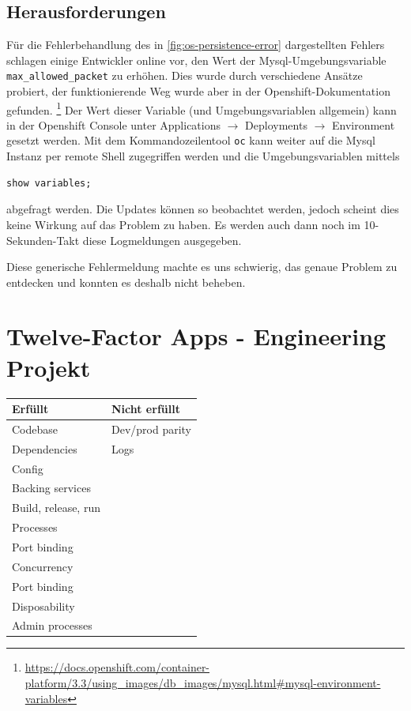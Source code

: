 \documentclass[12pt,a4paper]{article}
\begin{document}
\subsection{Herausforderungen}
Für die Fehlerbehandlung des in \ref{fig:os-persistence-error} dargestellten Fehlers schlagen einige Entwickler online vor, den Wert der Mysql-Umgebungsvariable \texttt{max\_allowed\_packet} zu erhöhen. Dies wurde durch verschiedene Ansätze probiert, der funktionierende Weg wurde aber in der Openshift-Dokumentation gefunden.  \footnote{\url{https://docs.openshift.com/container-platform/3.3/using\_images/db\_images/mysql.html\#mysql-environment-variables}}
Der Wert dieser Variable (und Umgebungsvariablen allgemein) kann in der Openshift Console unter Applications $\rightarrow$ Deployments $\rightarrow$ Environment gesetzt werden. Mit dem Kommandozeilentool \texttt{oc} kann weiter auf die Mysql Instanz per remote Shell zugegriffen werden und die Umgebungsvariablen mittels 
\begin{lstlisting}
show variables;
\end{lstlisting}
abgefragt werden. Die Updates können so beobachtet werden, jedoch scheint dies keine Wirkung auf das Problem zu haben. Es werden auch dann noch im 10-Sekunden-Takt diese Logmeldungen ausgegeben. 

Diese generische Fehlermeldung machte es uns schwierig, das genaue Problem zu entdecken und konnten es deshalb nicht beheben.



\section{Twelve-Factor Apps - Engineering Projekt}
    \begin{table}[H]
        \begin{tabular}{ll}
        \hline
        \textbf{Erfüllt}      & \textbf{Nicht erfüllt}     \\ \hline
        Codebase              & Dev/prod parity            \\ \hline
        Dependencies          & Logs                       \\
        Config                &                            \\
        Backing services      &                            \\
        Build, release, run   &                            \\
        Processes             &                            \\
        Port binding          &                            \\
        Concurrency           &                            \\
        Port binding          &                            \\
        Disposability         &                            \\
        Admin processes       &                            \\ \hline
        \end{tabular}
    \end{table}
\end{document}

